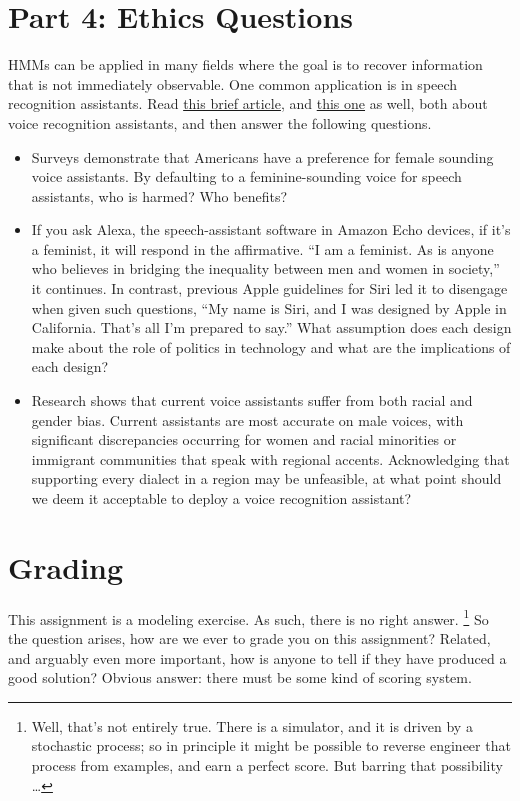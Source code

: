 \documentclass{article}
\begin{document}
\section{Part 4: Ethics Questions}

HMMs can be applied in many fields where the goal is to recover
information that is not immediately observable.  One common
application is in speech recognition assistants.  Read
\href{https://www.theguardian.com/technology/2020/jan/11/why-do-we-gender-ai-voice-tech-firms-move-to-be-more-inclusive}{this
  brief article}, and
\href{https://hbr.org/2019/05/voice-recognition-still-has-significant-race-and-gender-biases}{this
  one} as well, both about voice recognition assistants, and then
answer the following questions.

\begin{itemize}
\item Surveys demonstrate that Americans have a preference for female
  sounding voice assistants.  By defaulting to a feminine-sounding
  voice for speech assistants, who is harmed?  Who benefits?
  
\item If you ask Alexa, the speech-assistant software in Amazon Echo
  devices, if it’s a feminist, it will respond in the affirmative. ``I
  am a feminist.  As is anyone who believes in bridging the inequality
  between men and women in society,'' it continues.  In contrast,
  previous Apple guidelines for Siri led it to disengage when given
  such questions, ``My name is Siri, and I was designed by Apple in
  California.  That’s all I’m prepared to say.''  What assumption does
  each design make about the role of politics in technology and what
  are the implications of each design?
  
\item
  Research shows that current voice assistants suffer from both racial
  and gender bias.  Current assistants are most accurate on male
  voices, with significant discrepancies occurring for women and
  racial minorities or immigrant communities that speak with regional
  accents.  Acknowledging that supporting every dialect in a region
  may be unfeasible, at what point should we deem it acceptable to
  deploy a voice recognition assistant?
\end{itemize}


\section{Grading}
This assignment is a modeling exercise.
As such, there is no right answer.%
\footnote{Well, that's not entirely true.  There is a simulator, and
  it is driven by a stochastic process; so in principle it might be
  possible to reverse engineer that process from examples, and earn a
  perfect score.  But barring that possibility \ldots}
So the question arises, how are we ever to grade you on this assignment?
Related, and arguably even more important,
how is anyone to tell if they have produced a good solution?
Obvious answer: there must be some kind of scoring system.
\end{document}
